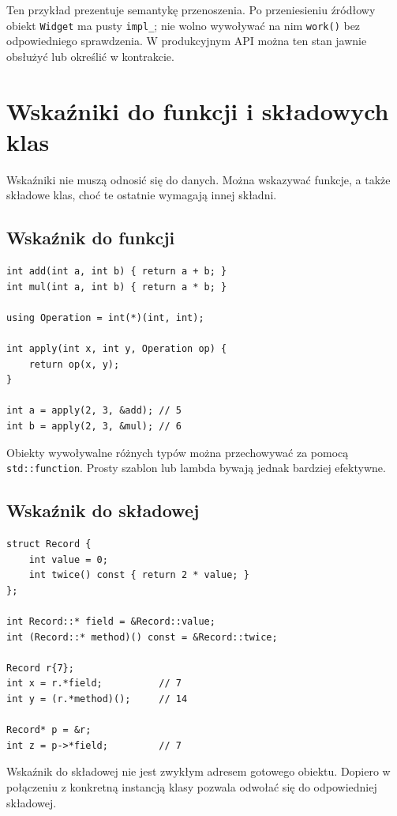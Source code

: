 Ten przykład prezentuje semantykę przenoszenia. Po przeniesieniu
źródłowy obiekt \texttt{Widget} ma pusty \texttt{impl\_};
nie wolno wywoływać na nim \texttt{work()} bez odpowiedniego
sprawdzenia. W produkcyjnym API można ten stan jawnie obsłużyć
lub określić w kontrakcie.

\section{Wskaźniki do funkcji i składowych klas}

Wskaźniki nie muszą odnosić się do danych. Można wskazywać
funkcje, a także składowe klas, choć te ostatnie wymagają
innej składni.

\subsection{Wskaźnik do funkcji}

\begin{lstlisting}
int add(int a, int b) { return a + b; }
int mul(int a, int b) { return a * b; }

using Operation = int(*)(int, int);

int apply(int x, int y, Operation op) {
    return op(x, y);
}

int a = apply(2, 3, &add); // 5
int b = apply(2, 3, &mul); // 6
\end{lstlisting}

Obiekty wywoływalne różnych typów można przechowywać za pomocą
\texttt{std::function}. Prosty szablon lub lambda bywają jednak
bardziej efektywne.

\subsection{Wskaźnik do składowej}

\begin{lstlisting}
struct Record {
    int value = 0;
    int twice() const { return 2 * value; }
};

int Record::* field = &Record::value;
int (Record::* method)() const = &Record::twice;

Record r{7};
int x = r.*field;          // 7
int y = (r.*method)();     // 14

Record* p = &r;
int z = p->*field;         // 7
\end{lstlisting}

Wskaźnik do składowej nie jest zwykłym adresem gotowego obiektu.
Dopiero w połączeniu z konkretną instancją klasy pozwala
odwołać się do odpowiedniej składowej.

